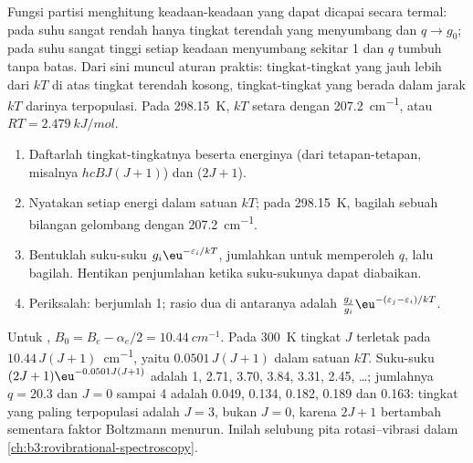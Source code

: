 Fungsi partisi menghitung keadaan-keadaan yang dapat dicapai secara termal:
pada suhu sangat rendah hanya tingkat terendah yang menyumbang dan $q \to g_0$;
pada suhu sangat tinggi setiap keadaan menyumbang sekitar 1 dan $q$ tumbuh tanpa
batas. Dari sini muncul aturan praktis: tingkat-tingkat yang jauh lebih dari
$kT$ di atas tingkat terendah kosong, tingkat-tingkat yang berada dalam jarak
$kT$ darinya terpopulasi. Pada \qty{298.15}{K}, $kT$ setara dengan
\qty{207.2}{cm^{-1}}, atau $RT = \qty{2.479}{kJ/mol}$.

\begin{method}\label{met:b3:partition-functions:populations}
\begin{enumerate}
  \item Daftarlah tingkat-tingkatnya beserta energinya (dari tetapan-tetapan,
        misalnya $hcBJ(J+1)$) dan  ($2J + 1$).
  \item Nyatakan setiap energi dalam satuan $kT$; pada \qty{298.15}{K}, bagilah
        sebuah bilangan gelombang dengan \qty{207.2}{cm^{-1}}.
  \item Bentuklah suku-suku $g_i\eu^{-\varepsilon_i/kT}$, jumlahkan untuk memperoleh
        $q$, lalu bagilah. Hentikan penjumlahan ketika suku-sukunya dapat
        diabaikan.
  \item Periksalah:  berjumlah 1; rasio dua di antaranya
        adalah $\frac{g_j}{g_i}\eu^{-(\varepsilon_j-\varepsilon_i)/kT}$.
\end{enumerate}
\end{method}

\begin{example}\label{ex:b3:partition-functions:hcl}
Untuk , $B_0 = B_e - \alpha_e/2 = \qty{10.44}{cm^{-1}}$. Pada \qty{300}{K}
tingkat $J$ terletak pada $10.44\,J(J+1)$~\unit{cm^{-1}}, yaitu $0.0501\,J(J+1)$
dalam satuan $kT$. Suku-suku $(2J+1)\eu^{-0.0501J(J+1)}$ adalah 1, 2.71, 3.70,
3.84, 3.31, 2.45, \dots; jumlahnya $q = 20.3$ dan  $J = 0$ sampai 4
adalah 0.049, 0.134, 0.182, 0.189 dan 0.163: tingkat yang paling terpopulasi
adalah $J = 3$, bukan $J = 0$, karena  $2J + 1$ bertambah sementara
faktor Boltzmann menurun. Inilah selubung pita rotasi--vibrasi dalam
\cref{ch:b3:rovibrational-spectroscopy}.
\end{example}

